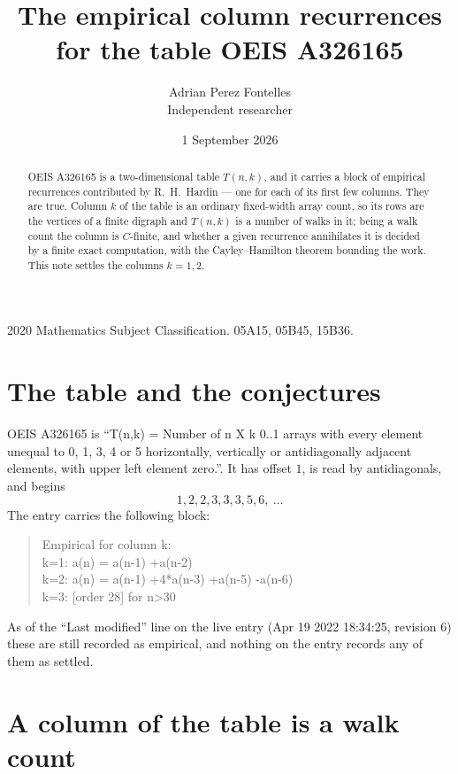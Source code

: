 \documentclass[11pt,a4paper]{article}
\title{The empirical column recurrences for the table OEIS A326165}
\author{Adrian Perez Fontelles\\ \small Independent researcher}
\date{1 September 2026}
\theoremstyle{plain}
\theoremstyle{definition}
\begin{document}
\maketitle

\begin{abstract}
OEIS A326165 is a two-dimensional table $T(n,k)$, and it carries a block of empirical
recurrences contributed by R.~H.~Hardin --- one for each of its first few columns. They are
true. Column $k$ of the table is an ordinary fixed-width array count, so its rows are the
vertices of a finite digraph and $T(n,k)$ is a number of walks in it; being a walk count the
column is $C$-finite, and whether a given recurrence annihilates it is decided by a finite
exact computation, with the Cayley--Hamilton theorem bounding the work. This note settles the columns $k=1, 2$.
\end{abstract}

\noindent\small 2020 Mathematics Subject Classification. 05A15, 05B45, 15B36.\normalsize

\section{The table and the conjectures}

OEIS A326165 is ``T(n,k) = Number of n X k 0..1 arrays with every element unequal to 0, 1, 3, 4 or 5 horizontally, vertically or antidiagonally adjacent elements, with upper left element zero.''. It has offset $1$, is
read by antidiagonals, and begins
\[
1, 2, 2, 3, 3, 3, 5, 6,\ \dots
\]
The entry carries the following block:
\begin{quote}\small
Empirical for column k:\\
k=1: a(n) = a(n-1) +a(n-2)\\
k=2: a(n) = a(n-1) +4*a(n-3) +a(n-5) -a(n-6)\\
k=3: [order 28] for n>30\\
\end{quote}
As of the ``Last modified'' line on the live entry (Apr 19 2022 18:34:25, revision 6) these are still
recorded as empirical, and nothing on the entry records any of them as settled.

\section{A column of the table is a walk count}
\end{document}
